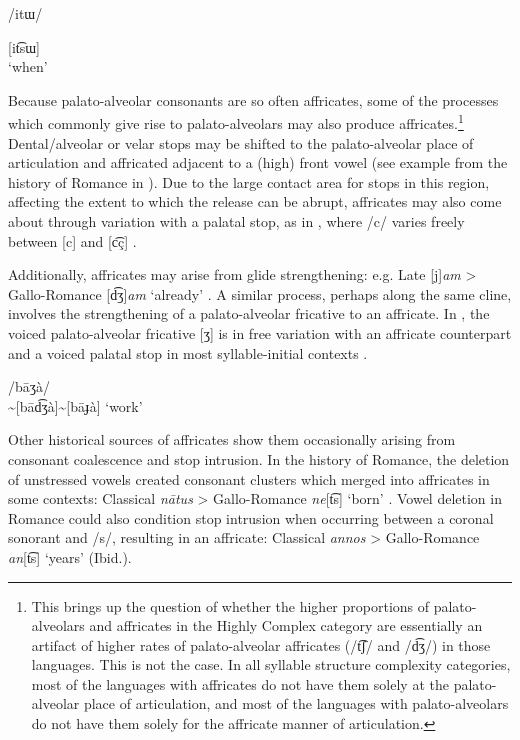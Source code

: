 /itɯ/

[it͡sɯ]\\
\glt ‘when’
\citep[22]{Tsujimura2013}
\z

  Because palato-alveolar consonants are so often affricates, some of the processes which commonly give rise to palato-alveolars may also produce affricates.\footnote{{This brings up the question of whether the higher proportions of palato-alveolars and affricates in the Highly Complex category are essentially an artifact of higher rates of palato-alveolar affricates (/t͡ʃ/ and /d͡ʒ/) in those languages. This is not the case. In all syllable structure complexity categories, most of the languages with affricates do not have them solely at the palato-alveolar place of articulation, and most of the languages with palato-alveolars do not have them solely for the affricate manner of articulation.}} Dental/alveolar or velar stops may be shifted to the palato-alveolar place of articulation and affricated adjacent to a (high) front vowel (see example from the history of Romance in ). Due to the large contact area for stops in this region, affecting the extent to which the release can be abrupt, affricates may also come about through variation with a palatal stop, as in , where /c/ varies freely between [c] and [c͡ç] \citep[17--18]{Hanson2010}.

  Additionally, affricates may arise from glide strengthening: e.g. Late  [j]\textit{am} > Gallo-Romance [d͡ʒ]\textit{am} ‘already’ \citep[132]{Berns2013}. A similar process, perhaps along the same cline, involves the strengthening of a palato-alveolar fricative to an affricate. In , the voiced palato-alveolar fricative [ʒ] is in free variation with an affricate counterpart and a voiced palatal stop in most syllable-initial contexts .
  
\noindent\parbox{\textwidth}{\ea\label{ex:4.46}
/bāʒà/\\\relax
[bāʒà]\textasciitilde{}[bād͡ʒà]\textasciitilde{}[bāɟà]
\glt ‘work’
\citep[86]{Hellenthal2010}
\z}

  Other historical sources of affricates show them occasionally arising from consonant coalescence and stop intrusion. In the history of Romance, the deletion of unstressed vowels created consonant clusters which merged into affricates in some contexts: Classical  \textit{n\={a}tus} > Gallo-Romance \textit{ne}[t͡s] ‘born’ \citep[128]{Berns2013}. Vowel deletion in Romance could also condition stop intrusion when occurring between a coronal sonorant and /s/, resulting in an affricate: Classical  \textit{annos} > Gallo-Romance \textit{an}[t͡s] ‘years’ (Ibid.).


